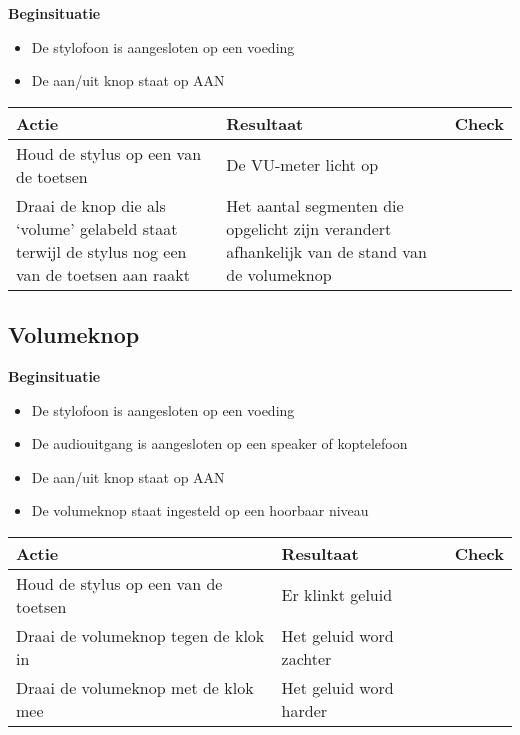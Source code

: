 \documentclass[12pt, a4paper, dutch]{article}
\newcommand{\cb}{\Square}
\newcommand{\stroom}{De stylofoon is aangesloten op een voeding}
\newcommand{\audio}{De audiouitgang is aangesloten op een speaker of koptelefoon}
\newcommand{\aan}{De aan/uit knop staat op AAN}
\newcommand{\vol}{De volumeknop staat ingesteld op een hoorbaar niveau}
\begin{document}
\begin{minipage}{\textwidth}
\textbf{Beginsituatie}
\begin{itemize}
	\item \stroom
	\item \aan
\end{itemize}

\medskip

\begin{tabularx}{\textwidth}{p{}p{}>{\raggedleft\arraybackslash}X}
\toprule
\textbf{Actie} & \textbf{Resultaat} & \textbf{Check}\\
\midrule
Houd de stylus op een van de toetsen &
De VU-meter licht op &
\cb\\

Draai de knop die als `volume' gelabeld staat terwijl de stylus nog een van de
toetsen aan raakt &
Het aantal segmenten die opgelicht zijn verandert afhankelijk van de stand van de
volumeknop &
\cb\\
\bottomrule
\end{tabularx}
\end{minipage}

\subsection{Volumeknop}

\begin{minipage}{\textwidth}
\textbf{Beginsituatie}
\begin{itemize}
	\item \stroom
	\item \audio
	\item \aan
	\item \vol
\end{itemize}

\medskip

\begin{tabularx}{\textwidth}{p{}p{}>{\raggedleft\arraybackslash}X}
\toprule
\textbf{Actie} & \textbf{Resultaat} & \textbf{Check}\\
\midrule
Houd de stylus op een van de toetsen &
Er klinkt geluid &
\cb\\

Draai de volumeknop tegen de klok in &
Het geluid word zachter &
\cb\\

Draai de volumeknop met de klok mee &
Het geluid word harder &
\cb\\
\bottomrule
\end{tabularx}
\end{minipage}
\end{document}
